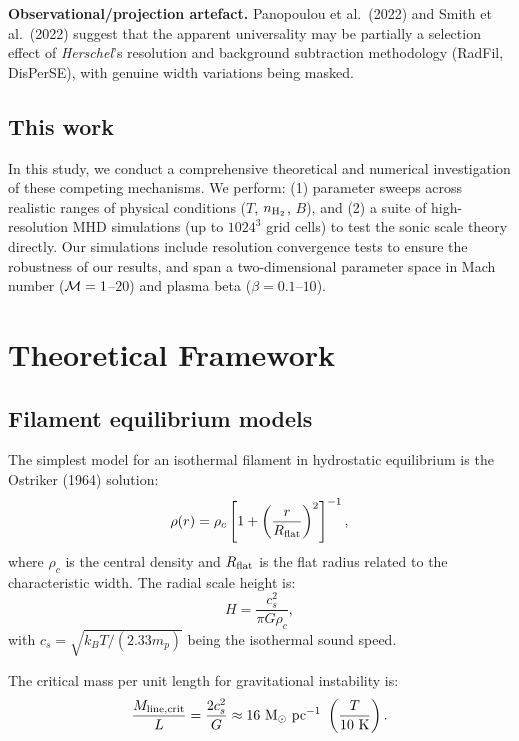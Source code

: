 \documentclass{mnras}
\begin{document}
\textbf{Observational/projection artefact.} Panopoulou et al.~(2022) and Smith et al.~(2022) suggest that the apparent universality may be partially a selection effect of \textit{Herschel}'s resolution and background subtraction methodology (RadFil, DisPerSE), with genuine width variations being masked.

\subsection{This work}

In this study, we conduct a comprehensive theoretical and numerical investigation of these competing mechanisms. We perform: (1) parameter sweeps across realistic ranges of physical conditions ($T$, $n_{\rm H_2}$, $B$), and (2) a suite of high-resolution MHD simulations (up to $1024^3$ grid cells) to test the sonic scale theory directly. Our simulations include resolution convergence tests to ensure the robustness of our results, and span a two-dimensional parameter space in Mach number (${\cal M} = 1$--$20$) and plasma beta ($\beta = 0.1$--$10$).


\section{Theoretical Framework}

\subsection{Filament equilibrium models}

The simplest model for an isothermal filament in hydrostatic equilibrium is the Ostriker (1964) solution:
\begin{equation}
\rho(r) = \rho_c \left[1 + \left(\frac{r}{R_{\rm flat}}\right)^2\right]^{-1},
\end{equation}
where $\rho_c$ is the central density and $R_{\rm flat}$ is the flat radius related to the characteristic width. The radial scale height is:
\begin{equation}
H = \frac{c_s^2}{\pi G \rho_c},
\end{equation}
with $c_s = \sqrt{k_B T / (2.33 m_p)}$ being the isothermal sound speed.

The critical mass per unit length for gravitational instability is:
\begin{equation}
\frac{M_{\rm line,crit}}{L} = \frac{2c_s^2}{G} \approx 16~{\rm M}_\odot~{\rm pc}^{-1}~\left(\frac{T}{10~{\rm K}}\right).
\end{equation}
\end{document}
